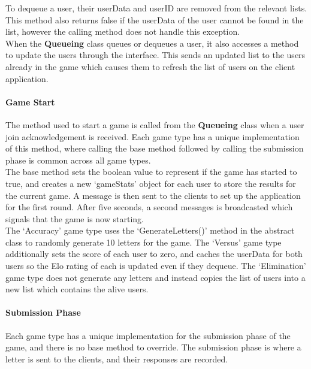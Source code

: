 \documentclass{article}
\begin{document}
To dequeue a user, their userData and userID are removed from the relevant lists. This method also returns false if the userData of the user cannot be found in the list, however the calling method does not handle this exception. \\

When the \textbf{Queueing} class queues or dequeues a user, it also accesses a method to update the users through the interface. This sends an updated list to the users already in the game which causes them to refresh the list of users on the client application.

\paragraph{Game Start\\}

The method used to start a game is called from the \textbf{Queueing} class when a user join acknowledgement is received. Each game type has a unique implementation of this method, where calling the base method followed by calling the submission phase is common across all game types. \\

The base method sets the boolean value to represent if the game has started to true, and creates a new `gameStats' object for each user to store the results for the current game. A message is then sent to the clients to set up the application for the first round. After five seconds, a second messages is broadcasted which signals that the game is now starting. \\

The `Accuracy' game type uses the `GenerateLetters()' method in the abstract class to randomly generate 10 letters for the game. The `Versus' game type additionally sets the score of each user to zero, and caches the userData for both users so the Elo rating of each is updated even if they dequeue. The `Elimination' game type does not generate any letters and instead copies the list of users into a new list which contains the alive users.

\paragraph{Submission Phase\\}

Each game type has a unique implementation for the submission phase of the game, and there is no base method to override. The submission phase is where a letter is sent to the clients, and their responses are recorded. \\
\end{document}

